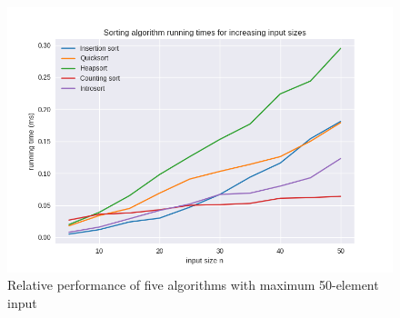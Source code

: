 \documentclass[12pt, a4paper]{article}
\begin{document}
\begin{figure}
    \includegraphics[width=\linewidth]{../bm_output/plot_0_linear_20210513-234313.png}
    \caption{Relative performance of five algorithms with maximum 50-element input}
    \label{fig:fifty}
\end{figure}



\clearpage

\printbibliography
\end{document}
